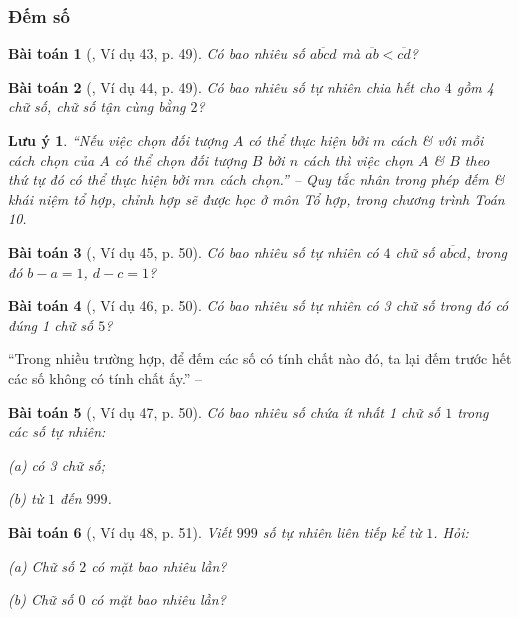 \documentclass{article}
\numberwithin{equation}{section}
\newtheorem{baitoan}{Bài toán}[section]
\newtheorem{luuy}{Lưu ý}[section]
\begin{document}
\subsubsection{Đếm số}

\begin{baitoan}[\cite{Binh_Toan_6_tap_1}, Ví dụ 43, p. 49]
	Có bao nhiêu số $\overline{abcd}$ mà $\overline{ab} < \overline{cd}$?
\end{baitoan}

\begin{baitoan}[\cite{Binh_Toan_6_tap_1}, Ví dụ 44, p. 49]
	Có bao nhiêu số tự nhiên chia hết cho $4$ gồm 4 chữ số, chữ số tận cùng bằng $2$?
\end{baitoan}

\begin{luuy}
	``Nếu việc chọn đối tượng $A$ có thể thực hiện bởi $m$ cách \& với mỗi cách chọn của $A$ có thể chọn đối tượng $B$ bởi $n$ cách thì việc chọn $A$ \& $B$ theo thứ tự đó có thể thực hiện bởi $mn$ cách chọn.'' -- \cite[p. 50]{Binh_Toan_6_tap_1} \emph{Quy tắc nhân trong phép đếm} \& khái niệm \emph{tổ hợp, chỉnh hợp} sẽ được học ở môn Tổ hợp, trong chương trình Toán 10.
\end{luuy}

\begin{baitoan}[\cite{Binh_Toan_6_tap_1}, Ví dụ 45, p. 50]
	Có bao nhiêu số tự nhiên có $4$ chữ số $\overline{abcd}$, trong đó $b - a = 1$, $d - c = 1$?
\end{baitoan}

\begin{baitoan}[\cite{Binh_Toan_6_tap_1}, Ví dụ 46, p. 50]
	Có bao nhiêu số tự nhiên có 3 chữ số trong đó có đúng 1 chữ số $5$?
\end{baitoan}
``Trong nhiều trường hợp, để đếm các số có tính chất nào đó, ta lại đếm trước hết các số không có tính chất ấy.'' -- \cite[p. 51]{Binh_Toan_6_tap_1}

\begin{baitoan}[\cite{Binh_Toan_6_tap_1}, Ví dụ 47, p. 50]
	Có bao nhiêu số chứa ít nhất 1 chữ số $1$ trong các số tự nhiên:
	\begin{enumerate*}
		\item[(a)] có 3 chữ số;
		\item[(b)] từ $1$ đến $999$.
	\end{enumerate*}
\end{baitoan}

\begin{baitoan}[\cite{Binh_Toan_6_tap_1}, Ví dụ 48, p. 51]
	Viết $999$ số tự nhiên liên tiếp kể từ $1$. Hỏi:
	\begin{enumerate*}
		\item[(a)] Chữ số $2$ có mặt bao nhiêu lần?
		\item[(b)] Chữ số $0$ có mặt bao nhiêu lần?
	\end{enumerate*}
\end{baitoan}
\end{document}
